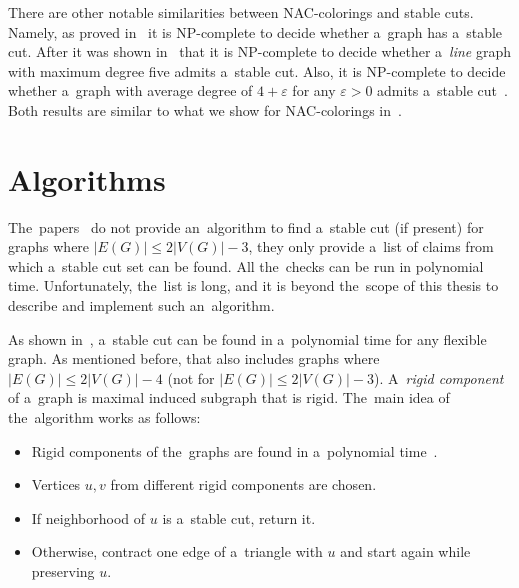 There are other notable similarities between NAC-colorings and stable cuts.
Namely, as proved in~\cite{stable_cuts_complexity_base} it is NP-complete
to decide whether a~graph has a~stable cut.
After it was shown in~\cite{stable_cuts_complexity_deg_five} that
it is NP-complete to decide whether a~\emph{line} graph with maximum degree five
admits a~stable cut.
%
Also, it is NP-complete to decide whether a~graph with average degree of
$4+\varepsilon$ for any $\varepsilon > 0$ admits a~stable cut~\cite{stable_cuts_complexity_deg_five}.
Both results are similar to what we show for NAC-colorings in~.
%

\section{Algorithms}%
\label{sec:stable_cut_algo}

The~papers~\cite{stable_cuts_2v_3,stable_cuts_2v_3_revisit} do not provide
an~algorithm to find a~stable cut (if present)
for graphs where \(|E(G)| \le 2|V(G)|-3 \),
they only provide a~list of claims
from which a~stable cut set can be found.
All the~checks can be run in polynomial time.
Unfortunately, the~list is long,
and it is beyond the~scope of this thesis
to describe and implement such an~algorithm.

As shown in~\cite[Algorithm 1]{stable_cuts_legersky}, a~stable cut can be found
in a~polynomial time for any flexible graph.
As mentioned before, that also includes graphs
where \( |E(G)| \le 2|V(G)| - 4 \) (not for \( |E(G)| \le 2|V(G)| - 3 \)).
A~\emph{rigid component} of a~graph is maximal induced subgraph that is rigid.
The~main idea of the~algorithm works as follows:
%
\begin{itemize}
	\item Rigid components of the~graphs are found in a~polynomial time~\cite{rigid_components_pebble_game}.
	\item Vertices \( u, v \) from different rigid components are chosen.
	\item If neighborhood of \( u \) is a~stable cut, return it.
	\item Otherwise, contract one edge of a~triangle with \( u \) and start again while preserving \( u \).
\end{itemize}

